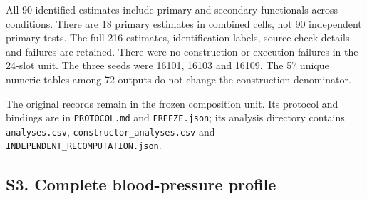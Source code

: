 \documentclass[11pt,letterpaper]{article}
\begin{document}
\endgroup

All 90 identified estimates include primary and secondary functionals across conditions. There are 18 primary estimates in combined cells, not 90 independent primary tests. The full 216 estimates, identification labels, source-check details and failures are retained. There were no construction or execution failures in the 24-slot unit. The three seeds were 16101, 16103 and 16109. The 57 unique numeric tables among 72 outputs do not change the construction denominator.


The original records remain in the frozen composition unit. Its protocol and bindings are in \texttt{PROTOCOL.md} and \texttt{FREEZE.json}; its analysis directory contains \texttt{analyses.csv}, \texttt{constructor\_\allowbreak{}analyses.csv} and \texttt{INDEPENDENT\_\allowbreak{}RECOMPUTATION.json}.



\subsection*{S3. Complete blood-pressure profile}

\FloatBarrier

\begingroup

\small

\renewcommand{\arraystretch}{1.22}
\end{document}
